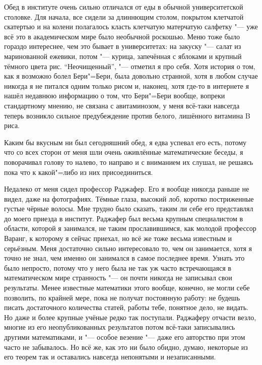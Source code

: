 Обед в институте очень сильно отличался от еды в обычной университетской
столовке.
Для начала, все сидели за длиннющим столом, покрытом клетчатой скатертью и на
колени полагалось класть клетчатую матерчатую салфетку "--- уже всё это в
академическом мире было необычной роскошью.
Меню тоже было гораздо интереснее, чем это бывает в университетах:
на закуску "--- салат из маринованной ежевики, потом "--- курица, запечённая с
яблоками и крупный тёмного цвета рис.
\enquote{Неочищенный}, "--- отметил я про себя.
Хотя история о том, как я возможно болел Бери"=Бери, была довольно странной, хотя
в любом случае никогда я не питался одним только рисом и, наконец, хотя где-то
в интернете я нашёл недавнюю информацию о том, что Бери"=Бери вообще, вопреки
стандартному мнению, не связана с авитаминозом, у меня всё-таки навсегда теперь
возникло сильное предубеждение против белого, лишённого витамина B риса.

Каким бы вкусным ни был сегодняшний обед, я едва успевал его есть, потому что со
всех сторон от меня шли очень оживлённые математические беседы, я поворачивал
голову то налево, то направо и с вниманием их слушал, не решаясь пока что к
какой"=либо из них присоединиться.

Недалеко от меня сидел профессор Раджафер.
Его я вообще никогда раньше не видел, даже на фотографиях.
Тёмные глаза, высокий лоб, коротко постриженные густые чёрные волосы.
Мне трудно было сказать, таким ли себе его представлял до моего приезда в
институт.
Раджафер был весьма крупным специалистом в области, которой я занимался, не
таким прославившимся, как молодой профессор Варанг, к которому я сейчас приехал,
но всё же тоже весьма известным и серьёзным.
Меня достаточно сильно интересовало то, чем он занимается, хотя я точно не знал,
чем именно он занимался в самое последнее время.
Узнать это было непросто, потому что у него была не так уж часто встречающаяся в
математическом мире странность "--- он почти никогда не записывал свои
результаты.
Менее известные математики этого вообще, конечно, не могли себе позволить, по
крайней мере, пока не получат постоянную работу:
не будешь писать достаточного количества статей, работы тебе, понятное дело, не
видать.
Но даже и более крупные учёные редко так поступали.
Раджаферу отчасти везло, многие из его неопубликованных результатов потом
всё-таки записывались другими математиками, и "--- особое везение "--- даже
его авторство при этом часто не забывалось.
Но всё же, как это ни было обидно, думаю, некоторые из его теорем так и
оставались навсегда непонятыми и незаписанными.

